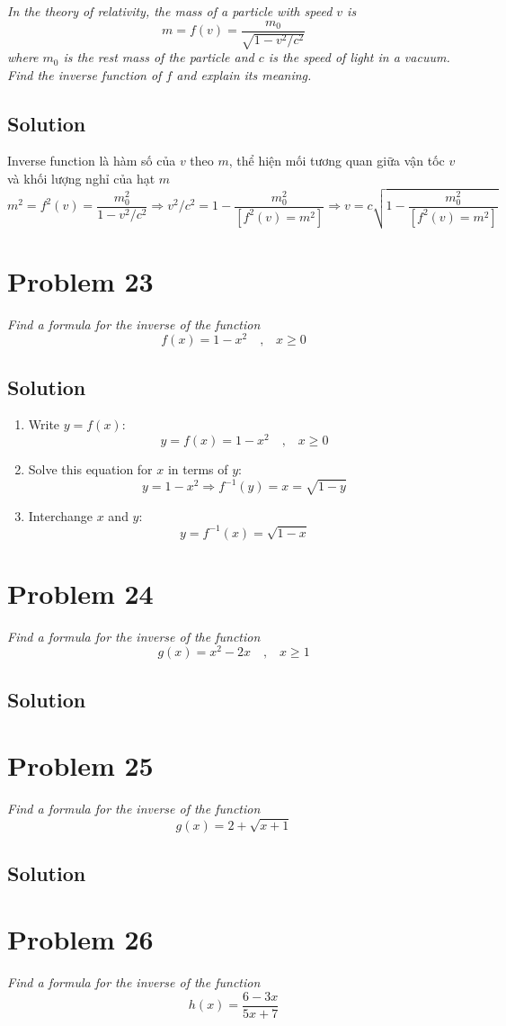 \documentclass[11pt]{article}
\newcommand{\soln}{\subsection*}
\newcommand{\qn}{\textit}
\newcommand{\eqtext}[1]{\quad\text{#1}\quad}
\begin{document}
\qn{In the theory of relativity, the mass of a particle with speed $v$ is $$m=f(v)=\frac{m_0}{\sqrt{1-v^2/c^2}}$$ where $m_0$ is the rest mass of the particle and $c$ is the speed of light in a vacuum. Find the inverse function of $f$ and explain its meaning.}

\soln{Solution}
Inverse function là hàm số của $v$ theo $m$, thể hiện mối tương quan giữa vận tốc $v$ và khối lượng nghỉ của hạt $m$
$$m^2=f^2(v)=\frac{m^2_0}{1-v^2/c^2} \Rightarrow v^2/c^2=1-\frac{m^2_0}{[f^2(v)=m^2]} \Rightarrow v=c\sqrt{1-\frac{m^2_0}{[f^2(v)=m^2]}}$$

\section*{Problem 23}

\qn{Find a formula for the inverse of the function $$f(x)=1-x^2 \eqtext{,} x \ge 0$$}

\soln{Solution}
\begin{enumerate}
	\item Write $y=f(x)$: $$y=f(x)=1-x^2 \eqtext{,} x \ge 0$$
	\item Solve this equation for $x$ in terms of $y$: $$y=1-x^2 \Rightarrow f^{-1}(y)=x=\sqrt{1-y}$$
	\item Interchange $x$ and $y$: $$y=f^{-1}(x)=\sqrt{1-x}$$
\end{enumerate}

\section*{Problem 24}

\qn{Find a formula for the inverse of the function $$g(x)=x^2-2x \eqtext{,} x \ge 1$$}

\soln{Solution}

\section*{Problem 25}

\qn{Find a formula for the inverse of the function $$g(x)=2+\sqrt{x+1}$$}

\soln{Solution}

\section*{Problem 26}

\qn{Find a formula for the inverse of the function $$h(x)=\frac{6-3x}{5x+7}$$}
\end{document}
